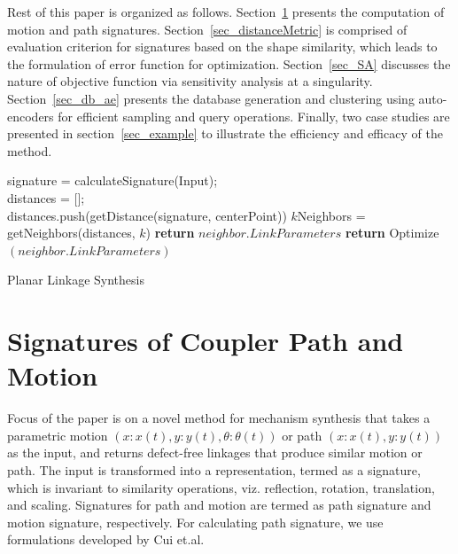 \documentclass[twocolumn,10pt]{asme2ej}
\begin{document}

Rest of this paper is organized as follows. Section~\ref{sec_sign} presents the computation of motion and path signatures.
Section~\ref{sec_distanceMetric} is comprised of evaluation criterion for signatures based on the shape similarity, which leads to the formulation of error function for optimization.
Section~\ref{sec_SA} discusses the nature of objective function via sensitivity analysis at a singularity.
Section~\ref{sec_db_ae} presents the database generation and clustering using auto-encoders for efficient sampling and query operations.
Finally, two case studies are presented in section~\ref{sec_example} to illustrate the efficiency and efficacy of the method.

\begin{algorithm}
    signature = calculateSignature(Input); \\
    distances = [];\\
    {
      distances.push(getDistance(signature, centerPoint))
    }
    $k$Neighbors = getNeighbors(distances, $k$)
    {
      {
        \textbf{return} $neighbor.LinkParameters$
      }
      {
        \textbf{return} Optimize$(neighbor.LinkParameters)$
      }
    }
    \caption{Planar Linkage Synthesis}
    \label{alg_overall}
\end{algorithm}

\section{Signatures of Coupler Path and Motion}\label{sec_sign}
Focus of the paper is on a novel method for mechanism synthesis that takes a parametric motion $(x:x(t), y:y(t), \theta:\theta(t))$ or path $(x:x(t), y:y(t))$ as the input, and returns defect-free linkages that produce similar motion or path.
The input is transformed into a representation, termed as a signature, which is invariant to similarity operations, viz. reflection, rotation, translation, and scaling.
Signatures for path and motion are termed as path signature and motion signature, respectively.
For calculating path signature, we use formulations developed by Cui et.al\cite{cui2009}.
\end{document}
